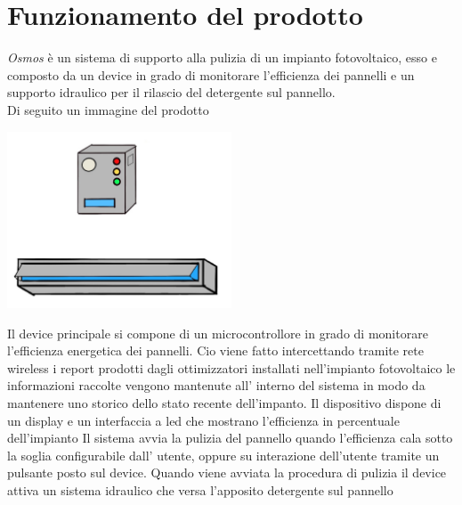 \documentclass[a4paper, 12pt]{article}
\begin{document}
	\section{Funzionamento del prodotto}
	

	\emph{Osmos} è un sistema di supporto alla pulizia di un impianto fotovoltaico,
	 esso e composto da un device in grado di monitorare l'efficienza dei pannelli 
	 e un supporto idraulico per il rilascio del detergente sul pannello.\\Di seguito un immagine del prodotto


	\begin{center}
		\includegraphics[width=0.5\textwidth]{Images/prototipo.jpg}
	\end{center}

	Il device principale si compone di un microcontrollore in grado di monitorare l'efficienza energetica dei pannelli.
	Cio viene fatto intercettando tramite rete wireless i report prodotti dagli ottimizzatori installati nell'impianto fotovoltaico
	le informazioni raccolte vengono mantenute all' interno del sistema in modo da mantenere uno storico dello stato recente dell'impanto.
	Il dispositivo dispone di un display e un interfaccia a led che mostrano l'efficienza in percentuale dell'impianto 
	Il sistema avvia la pulizia del pannello quando l'efficienza cala sotto la soglia configurabile dall' utente, 
	oppure su interazione dell'utente tramite un pulsante posto sul device.
	Quando viene avviata la procedura di pulizia il device attiva un sistema idraulico che versa l'apposito detergente sul pannello\\
	\\
	
\end{document}
